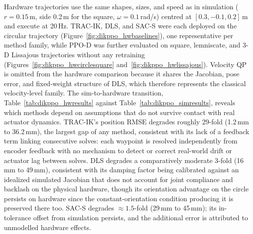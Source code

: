 Hardware trajectories use the same shapes, sizes, and speed as in simulation ($r = 0.15$\,m, side
0.2\,m for the square, $\omega = 0.1$\,rad/s) centred at $[0.3, -0.1, 0.2]$\,m and execute at 20\,Hz.
TRAC-IK, DLS, and SAC-S were each deployed on the circular trajectory
(Figure~\ref{fig:dikppo_hwbaselines}), one representative per method family, while PPO-D was further
evaluated on square, lemniscate, and 3-D Lissajous trajectories without any retraining
(Figures~\ref{fig:dikppo_hwcirclesquare} and~\ref{fig:dikppo_hwlissajous}). Velocity QP is omitted
from the hardware comparison because it shares the Jacobian, pose error, and fixed-weight structure
of DLS, which therefore represents the classical velocity-level family. The sim-to-hardware
transition, Table~\ref{tab:dikppo_hwresults} against Table~\ref{tab:dikppo_simresults}, reveals which
methods depend on assumptions that do not survive contact with real actuator dynamics. TRAC-IK's
position RMSE degrades roughly 29-fold (1.2\,mm to 36.2\,mm), the largest gap of any method,
consistent with its lack of a feedback term linking consecutive solves: each waypoint is resolved
independently from encoder feedback with no mechanism to detect or correct real-world drift or
actuator lag between solves. DLS degrades a comparatively moderate 3-fold (16\,mm to 49\,mm),
consistent with its damping factor being calibrated against an idealized simulated Jacobian that
does not account for joint compliance and backlash on the physical hardware, though its orientation
advantage on the circle persists on hardware since the constant-orientation condition producing it
is preserved there too. SAC-S degrades $\approx 1.5$-fold (29\,mm to 45\,mm); its in-tolerance offset
from simulation persists, and the additional error is attributed to unmodelled hardware effects.

